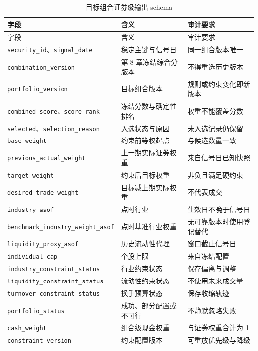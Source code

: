 \begingroup
\small
\begin{longtable}{@{}p{4.4cm}p{4.8cm}p{5.6cm}@{}}
\caption{目标组合证券级输出 schema}\label{tab:ch09-output-schema}\\
\toprule
字段 & 含义 & 审计要求 \\
\midrule
\endfirsthead
\toprule
字段 & 含义 & 审计要求 \\
\midrule
\endhead
\texttt{security\_id}、\texttt{signal\_date} & 稳定主键与信号日 & 同一组合版本唯一 \\
\texttt{combination\_version} & 第 8 章冻结综合分版本 & 不得重选历史版本 \\
\texttt{portfolio\_version} & 目标组合版本 & 规则或约束变化即新版本 \\
\texttt{combined\_score}、\texttt{score\_rank} & 冻结分数与确定性排名 & 权重不能覆盖分数 \\
\texttt{selected}、\texttt{selection\_reason} & 入选状态与原因 & 未入选记录仍保留 \\
\texttt{base\_weight} & 约束前等权起点 & 与候选数量一致 \\
\texttt{previous\_actual\_weight} & 上一期实际证券权重 & 来自信号日已知快照 \\
\texttt{target\_weight} & 约束后目标权重 & 非负且满足硬约束 \\
\texttt{desired\_trade\_weight} & 目标减上期实际权重 & 不代表成交 \\
\texttt{industry\_asof} & 点时行业 & 生效日不晚于信号日 \\
\texttt{benchmark\_industry\_weight\_asof} & 点时基准行业权重 & 无可靠版本时使用登记替代 \\
\texttt{liquidity\_proxy\_asof} & 历史流动性代理 & 窗口截止信号日 \\
\texttt{individual\_cap} & 个股上限 & 来自冻结配置 \\
\texttt{industry\_constraint\_status} & 行业约束状态 & 保存偏离与调整 \\
\texttt{liquidity\_constraint\_status} & 流动性约束状态 & 不使用未来成交量 \\
\texttt{turnover\_constraint\_status} & 换手预算状态 & 保存收缩轨迹 \\
\texttt{portfolio\_status} & 成功、部分配置或不可行 & 不静默忽略失败 \\
\texttt{cash\_weight} & 组合级现金权重 & 与证券权重合计为 1 \\
\texttt{constraint\_version} & 约束配置版本 & 可重放优先级与降级 \\
\bottomrule
\end{longtable}
\endgroup

